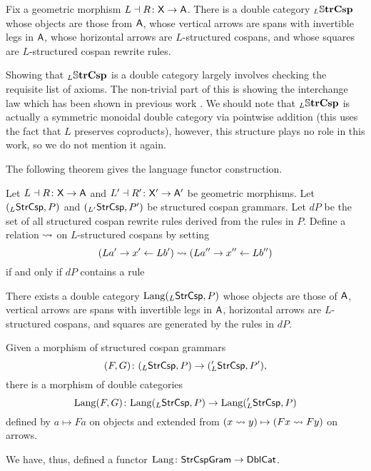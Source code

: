 \documentclass{amsart}
\begin{document}
\begin{definition}\label{df:L_SSStrCsp}
  Fix a geometric morphism $L\dashv R \colon \mathsf{X} \to
  \mathsf{A}$. There is a double category $_L\mathbb{S} \mathbf{trCsp}$ whose
  objects are those from $\mathsf{A}$, whose vertical arrows are
  spans with invertible legs in $\mathsf{A}$, whose horizontal
  arrows are $L$-structured cospans, and whose squares
  are $L$-structured cospan rewrite rules.    
\end{definition}

Showing that $_L\mathbb{S} \mathbf{trCsp}$ is a double category
largely involves checking the requisite list of
axioms. The non-trivial part of this is showing
the interchange law which has been shown in
previous work \cite[Lem.~4.2,
Lem.~4.3]{CicCour_SpCspTopos}. We should note that
$ _L\mathbb{S} \mathbf{trCsp} $ is actually a symmetric monoidal
double category via pointwise addition
\cite[Lem.~4.4]{CicCour_SpCspTopos} (this uses the
fact that $ L $ preserves coproducts), however,
this structure plays no role in this work, so we
do not mention it again.

The following theorem gives the language
functor construction.

\begin{theorem}
  \label{thm:StrCsp_Lang_functorial}
  Let $ L \dashv R \colon \mathsf{X} \to \mathsf{A} $ and
  $ L' \dashv R' \colon \mathsf{X}' \to \mathsf{A}' $ be geometric
  morphisms. Let $ (_L\mathsf{StrCsp},P) $ and
  $ ( _{L'}\mathsf{StrCsp},P' ) $ be structured cospan
  grammars. Let $ dP $ be the set of all
  structured cospan rewrite rules derived from the
  rules in $ P $. Define a relation
  $ \rightsquigarrow $ on $ L $-structured cospans by
  setting
  $$ ( La' \to x' \leftarrow Lb' ) \rightsquigarrow ( La'' \to x''
    \leftarrow Lb'' ) $$ if and only if $ dP $ contains a rule
  
  
  There exists a double category
  $ \mathrm{Lang} (_L\mathsf{StrCsp} , P) $ whose objects are
  those of $ \mathsf{A} $, vertical arrows are spans with
  invertible legs in $ \mathsf{A} $, horizontal arrows are
  $ L $-structured cospans, and
  squares are generated by the rules in $ dP $.

  Given a morphism of structured cospan grammars
  $$ (F,G) \colon (_L \mathsf{StrCsp}, P) \to ({_L'}\mathsf{StrCsp} , P'), $$
  there is a morphism of double categories
  $$ \mathrm{Lang} (F,G) \colon \mathrm{Lang} (_L \mathsf{StrCsp}, P) \to \mathrm{Lang} (_L'
  \mathsf{StrCsp}, P) $$ defined by $ a \mapsto Fa $ on objects and
  extended from
  $ (x \rightsquigarrow y) \mapsto ( Fx \rightsquigarrow Fy ) $ on
  arrows.

  We have, thus, defined a functor
  $ \mathrm{Lang} \colon \mathsf{StrCspGram} \to \mathsf{DblCat} $.
\end{theorem}
\end{document}
